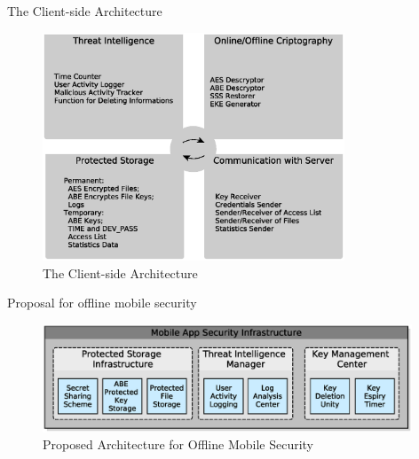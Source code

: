 \documentclass[newPxFont, numfooter, sectionpages]{beamer}
\begin{document}
\begin{frame}[c]{The Client-side Architecture}
	
	\begin{figure}[h!]
		\centering
		\includegraphics[width=9cm]{../figures/fig02.eps}
		\caption{The Client-side Architecture}
		\label{fig:3_02}
	\end{figure}
	
\end{frame}
\begin{frame}[c]{Proposal for offline mobile security}
	
	\begin{figure}[h!]
		\centering
		\includegraphics[width=11cm]{../figures/fig03.eps}
		\caption{Proposed Architecture for Offline Mobile Security}
		\label{fig:3_03}
	\end{figure}
	
\end{frame}
\end{document}
